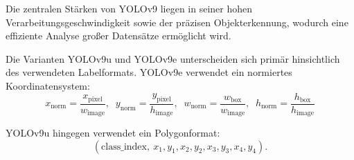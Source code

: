 Die zentralen Stärken von \acrshort{YOLO}v9 liegen in seiner hohen Verarbeitungsgeschwindigkeit sowie der präzisen Objekterkennung, wodurch eine effiziente Analyse großer Datensätze ermöglicht wird. 


Die Varianten \acrshort{YOLO}v9u und \acrshort{YOLO}v9e unterscheiden sich primär hinsichtlich des verwendeten Labelformats. \acrshort{YOLO}v9e verwendet ein normiertes Koordinatensystem:
\hypertarget{eq:yolov9}{}
\begin{equation}
x_\text{norm} = \frac{x_\text{pixel}}{w_\text{image}},\;\;
y_\text{norm} = \frac{y_\text{pixel}}{h_\text{image}},\;\;
w_\text{norm} = \frac{w_\text{box}}{w_\text{image}},\;\;
h_\text{norm} = \frac{h_\text{box}}{h_\text{image}}
\end{equation}
\label{Eq:yolov9}

\hypertarget{eq:yolov9u}{}
\acrshort{YOLO}v9u hingegen verwendet ein Polygonformat:
\begin{equation}
(\text{class\_index},\ x_1, y_1, x_2, y_2, x_3, y_3, x_4, y_4).
\end{equation}






